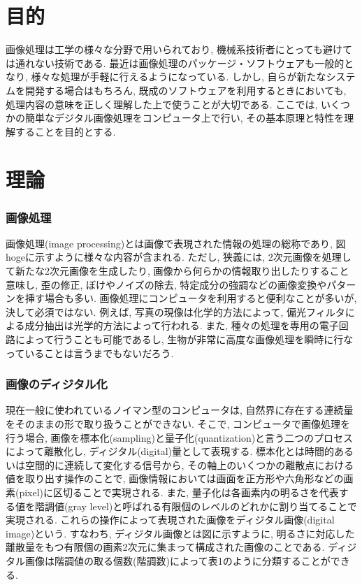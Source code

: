 \documentclass[a4paper,11pt,uplatex]{jsarticle}
\begin{document}
\section{目的}
画像処理は工学の様々な分野で用いられており, 機械系技術者にとっても避けては通れない技術である.
最近は画像処理のパッケージ・ソフトウェアも一般的となり, 様々な処理が手軽に行えるようになっている.
しかし, 自らが新たなシステムを開発する場合はもちろん, 既成のソフトウェアを利用するときにおいても,
処理内容の意味を正しく理解した上で使うことが大切である. ここでは, いくつかの簡単なデジタル画像処理をコンピュータ上で行い,
その基本原理と特性を理解することを目的とする.
\section{理論}
\subsubsection{画像処理}
画像処理(image processing)とは画像で表現された情報の処理の総称であり, 図hogeに示すように様々な内容が含まれる.
ただし, 狭義には, 2次元画像を処理して新たな2次元画像を生成したり, 画像から何らかの情報取り出したりすること意味し,
歪の修正, ぼけやノイズの除去, 特定成分の強調などの画像変換やパターンを挿す場合も多い. 画像処理にコンピュータを利用すると便利なことが多いが,
決して必須ではない. 例えば, 写真の現像は化学的方法によって, 偏光フィルタによる成分抽出は光学的方法によって行われる.
また, 種々の処理を専用の電子回路によって行うことも可能であるし, 生物が非常に高度な画像処理を瞬時に行なっていることは言うまでもないだろう.
\subsubsection{画像のディジタル化}
現在一般に使われているノイマン型のコンピュータは, 自然界に存在する連続量をそのままの形で取り扱うことができない.
そこで, コンピュータで画像処理を行う場合, 画像を標本化(sampling)と量子化(quantization)と言う二つのプロセスによって離散化し,
ディジタル(digital)量として表現する. 標本化とは時間的あるいは空間的に連続して変化する信号から,
その軸上のいくつかの離散点における値を取り出す操作のことで, 画像情報においては画面を正方形や六角形などの画素(pixel)に区切ることで実現される.
また, 量子化は各画素内の明るさを代表する値を階調値(gray level)と呼ばれる有限個のレベルのどれかに割り当てることで実現される.
これらの操作によって表現された画像をディジタル画像(digital image)という. すなわち, ディジタル画像とは図に示すように,
明るさに対応した離散量をもつ有限個の画素2次元に集まって構成された画像のことである.
ディジタル画像は階調値の取る個数(階調数)によって表1のように分類することができる.
\end{document}

